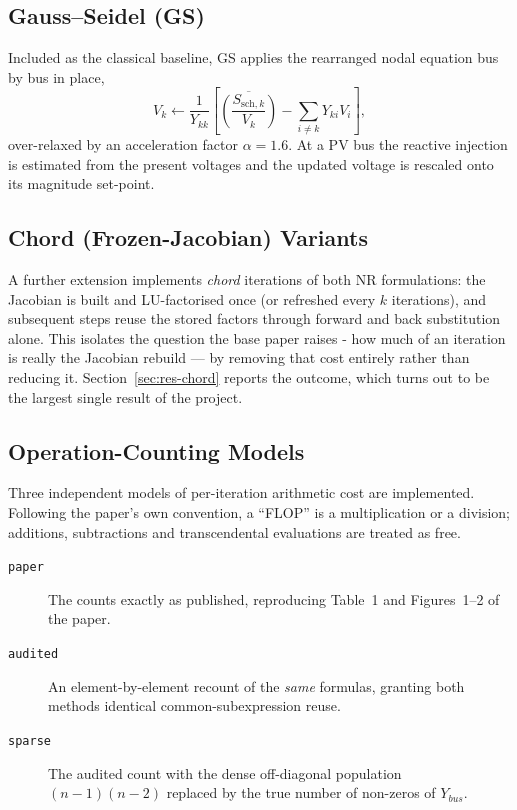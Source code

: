 \documentclass[sigconf,nonacm]{acmart}
\begin{document}
\subsection{Gauss--Seidel (GS)}
Included as the classical baseline, GS applies the rearranged nodal equation
bus by bus in place,
\begin{equation}
V_k \leftarrow \frac{1}{Y_{kk}}
  \left[\overline{\left(\frac{S_{\mathrm{sch},k}}{V_k}\right)}
        - \sum_{i\neq k} Y_{ki}V_i\right],
\end{equation}
over-relaxed by an acceleration factor $\alpha = 1.6$. At a PV bus the reactive
injection is estimated from the present voltages and the updated voltage is
rescaled onto its magnitude set-point.

\subsection{Chord (Frozen-Jacobian) Variants}
A further extension implements \emph{chord} iterations of both NR formulations:
the Jacobian is built and LU-factorised once (or refreshed every $k$
iterations), and subsequent steps reuse the stored factors through forward and
back substitution alone. This isolates the question the base paper raises -
how much of an iteration is really the Jacobian rebuild --- by removing that
cost entirely rather than reducing it. Section~\ref{sec:res-chord} reports the
outcome, which turns out to be the largest single result of the project.

\subsection{Operation-Counting Models}
\label{sec:method-flops}
Three independent models of per-iteration arithmetic cost are implemented.
Following the paper's own convention, a ``FLOP'' is a multiplication or a
division; additions, subtractions and transcendental evaluations are treated as
free.

\begin{description}
\item[\texttt{paper}] The counts exactly as published, reproducing Table~1 and
  Figures~1--2 of the paper.
\item[\texttt{audited}] An element-by-element recount of the \emph{same}
  formulas, granting both methods identical common-subexpression reuse.
\item[\texttt{sparse}] The audited count with the dense off-diagonal population
  $(n-1)(n-2)$ replaced by the true number of non-zeros of $Y_{bus}$.
\end{description}
\end{document}
